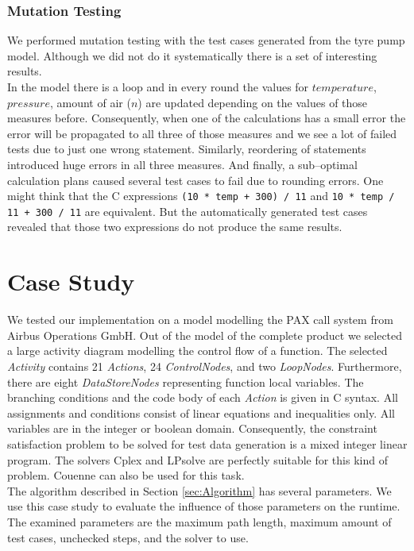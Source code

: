 \documentclass[runningheads,a4paper]{llncs}%
\newcommand{\UMLType}[1]{\textsf{\textit{#1}}} %
\begin{document}
\subsubsection{Mutation Testing}
We performed mutation testing with the test cases generated from the tyre pump model. Although we did not do it systematically there is a set of interesting results.\\
In the model there is a loop and in every round the values for $temperature$, $pressure$, amount of air ($n$) are updated depending on the values of those measures before. Consequently, when one of the calculations has a small error the error will be propagated to all three of those measures and we see a lot of failed tests due to just one wrong statement. Similarly, reordering of statements introduced huge errors in all three measures. And finally, a sub--optimal calculation plans caused several test cases to fail due to rounding errors. One might think that the C expressions \verb$(10 * temp + 300) / 11$ and \verb$10 * temp / 11 + 300 / 11$ are equivalent. But the automatically generated test cases revealed that those two expressions do not produce the same results.
\section{Case Study}%
\label{sec:CaseStudy}%
We tested our implementation on a model modelling the PAX call system from Airbus Operations GmbH. Out of the model of the complete product we selected a large activity diagram modelling the control flow of a function. The selected \UMLType{Activity} contains 21 \UMLType{Actions}, 24 \UMLType{ControlNodes}, and two \UMLType{LoopNodes}. Furthermore, there are eight \UMLType{DataStoreNodes} representing function local variables. The branching conditions and the code body of each \UMLType{Action} is given in C syntax. All assignments and conditions consist of linear equations and inequalities only. All variables are in the integer or boolean domain. Consequently, the constraint satisfaction problem to be solved for test data generation is a mixed integer linear program. The solvers Cplex and LPsolve are perfectly suitable for this kind of problem. Couenne can also be used for this task.\\%
The algorithm described in Section \ref{sec:Algorithm} has several parameters. We use this case study to evaluate the influence of those parameters on the runtime. The examined parameters are the maximum path length, maximum amount of test cases, unchecked steps, and the solver to use.%
\end{document}
